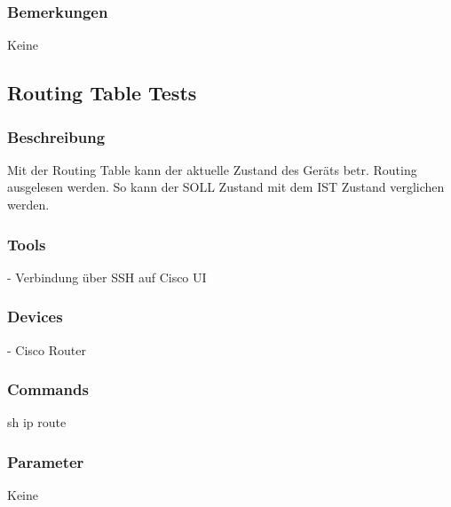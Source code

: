 \documentclass[a4,12pt]{scrartcl}
\begin{document}
\subsubsection{Bemerkungen}
Keine

\subsection{Routing Table Tests}
\subsubsection{Beschreibung}
Mit der Routing Table kann der aktuelle Zustand des Geräts betr. Routing ausgelesen werden. So kann der SOLL Zustand mit dem IST Zustand verglichen werden.
\subsubsection{Tools}
- Verbindung über SSH auf Cisco UI
\subsubsection{Devices}
- Cisco Router
\subsubsection{Commands}
sh ip route
\subsubsection{Parameter}
Keine
\end{document}
